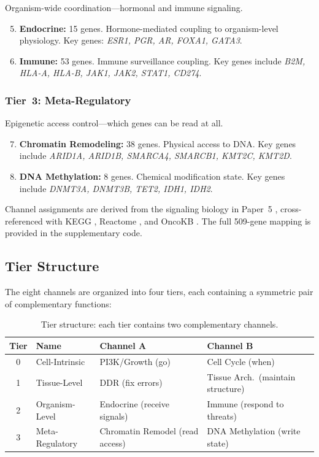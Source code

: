 \documentclass[11pt]{article}
\begin{document}
Organism-wide coordination---hormonal and immune signaling.

\begin{enumerate}
\setcounter{enumi}{4}
\item \textbf{Endocrine:} 15 genes. Hormone-mediated coupling to
   organism-level physiology. Key genes: \emph{ESR1, PGR, AR,
   FOXA1, GATA3}.
\item \textbf{Immune:} 53 genes. Immune surveillance coupling.
   Key genes include \emph{B2M, HLA-A, HLA-B, JAK1, JAK2,
   STAT1, CD274}.
\end{enumerate}

\subsubsection{Tier~3: Meta-Regulatory}

Epigenetic access control---which genes can be read at all.

\begin{enumerate}
\setcounter{enumi}{6}
\item \textbf{Chromatin Remodeling:} 38 genes. Physical access
   to DNA. Key genes include \emph{ARID1A, ARID1B, SMARCA4,
   SMARCB1, KMT2C, KMT2D}.
\item \textbf{DNA Methylation:} 8 genes. Chemical modification
   state. Key genes include \emph{DNMT3A, DNMT3B, TET2, IDH1,
   IDH2}.
\end{enumerate}

Channel assignments are derived from the signaling biology in
Paper~5 \cite{McCarthy2026e}, cross-referenced with KEGG
\cite{Kanehisa2000}, Reactome \cite{Jassal2020}, and OncoKB
\cite{Chakravarty2017}. The full 509-gene mapping is provided
in the supplementary code.

\subsection{Tier Structure}

The eight channels are organized into four tiers, each containing
a symmetric pair of complementary functions:

\begin{table}[ht]
\centering
\caption{Tier structure: each tier contains two complementary
channels.}
\label{tab:tiers}
\begin{tabular}{@{}clll@{}}
\toprule
Tier & Name & Channel A & Channel B \\
\midrule
0 & Cell-Intrinsic & PI3K/Growth (go) & Cell Cycle (when) \\
1 & Tissue-Level & DDR (fix errors) & Tissue Arch.\ (maintain structure) \\
2 & Organism-Level & Endocrine (receive signals) & Immune (respond to threats) \\
3 & Meta-Regulatory & Chromatin Remodel (read access) & DNA Methylation (write state) \\
\bottomrule
\end{tabular}
\end{table}
\end{document}
